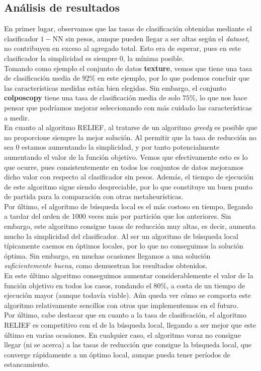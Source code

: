 \documentclass[12pt]{article}
\begin{document}
\subsection*{Análisis de resultados}

En primer lugar, observamos que las tasas de clasificación obtenidas mediante el clasificador $1-$NN sin pesos, aunque pueden llegar a ser altas según el \textit{dataset}, no contribuyen en exceso al agregado total. Esto era de esperar, pues en este clasificador la simplicidad es siempre $0$, la mínima posible.\\

Tomando como ejemplo el conjunto de datos \textbf{texture}, vemos que tiene una tasa de clasificación media de $92\%$ en este ejemplo, por lo que podemos concluir que las características medidas están bien elegidas. Sin embargo, el conjunto \textbf{colposcopy} tiene una tasa de clasificación media de solo $75\%$, lo que nos hace pensar que podríamos mejorar seleccionando con más cuidado las características a medir.\\

En cuanto al algoritmo RELIEF, al tratarse de un algoritmo \textit{greedy} es posible que no proporcione siempre la mejor solución. Al permitir que la tasa de reducción no sea $0$ estamos aumentando la simplicidad, y por tanto potencialmente aumentando el valor de la función objetivo. Vemos que efectivamente esto es lo que ocurre, pues consistentemente en todos los conjuntos de datos mejoramos dicho valor con respecto al clasificador sin pesos. Además, el tiempo de ejecución de este algoritmo sigue siendo despreciable, por lo que constituye un buen punto de partida para la comparación con otras metaheurísticas.\\

Por último, el algoritmo de búsqueda local es el más costoso en tiempo, llegando a tardar del orden de 1000 veces más por partición que los anteriores. Sin embargo, este algoritmo consigue tasas de reducción muy altas, es decir, aumenta mucho la simplicidad del clasificador. Al ser un algoritmo de búsqueda local típicamente caemos en óptimos locales, por lo que no conseguimos la solución óptima. Sin embargo, en muchas ocasiones llegamos a una solución \textit{suficientemente buena}, como demuestran los resultados obtenidos.\\

En este último algoritmo conseguimos aumentar considerablemente el valor de la función objetivo en todos los casos, rondando el 80$\%$, a costa de un tiempo de ejecución mayor (aunque todavía viable). Aún queda ver cómo se comporta este algoritmo relativamente sencillos con otros que implementemos en el futuro.\\

Por último, cabe destacar que en cuanto a la tasa de clasificación, el algoritmo RELIEF es competitivo con el de la búsqueda local, llegando a ser mejor que este último en varias ocasiones. En cualquier caso, el algoritmo voraz no consigue llegar (ni se acerca) a las tasas de reducción que consigue la búsqueda local, que converge rápidamente a un óptimo local, aunque pueda tener períodos de estancamiento.
\end{document}
